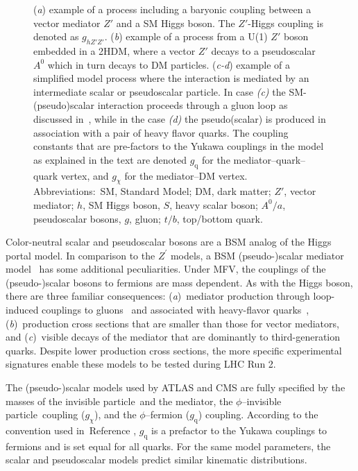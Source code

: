 \documentclass{ar-1col}
\newcommand{\chiDM}{\ensuremath{\chi}\xspace}
\newcommand{\IP}{invisible particle}
\newcommand{\gDM}{\ensuremath{g_{\chiDM}}\xspace}
\newcommand{\gdm}{\gDM}
\newcommand{\gq}{$g_{\mathrm{q}}$\xspace}
\newcommand{\ghZprimeZprime}{\ensuremath{g_{hZ'Z'}}\xspace}
\newcommand{\Zprime}{\ensuremath{{Z}^\prime}\xspace}
\begin{document}
\begin{figure}[!htpb]
\caption{
(\textit{a}) example of a process including a baryonic coupling between a vector mediator $Z'$ and a SM Higgs boson. The $Z'$-Higgs coupling is denoted as \ghZprimeZprime. 
(\textit{b}) example of a process from a U(1) $Z'$ boson embedded in a 2HDM, where a vector $Z'$ decays to a pseudoscalar $A^0$ which in turn decays to DM particles. 
(\textit{c-d}) example of a simplified model process where the interaction is mediated by an intermediate scalar or pseudoscalar particle. In case \textit{(c)} the SM-(pseudo)scalar interaction proceeds through a gluon loop as discussed in~\cite{Haisch:2013ata}, while in the case \textit{(d)} the pseudo(scalar) is produced in association with a pair of heavy flavor quarks. The coupling constants that are pre-factors to the Yukawa couplings in the model as explained in the text are denoted \gq for the mediator--quark--quark vertex, and \gdm for the mediator--DM vertex. 
Abbreviations:\ SM, Standard Model; DM, dark matter; $Z'$, vector mediator; $h$, SM Higgs boson, $S$, heavy scalar boson; $A^0/a$, pseudoscalar bosons, $g$, gluon; $t/b$, top/bottom quark. }
\label{fig:feynman_1}
\end{figure}

{Color-neutral scalar and pseudoscalar bosons} are a BSM
analog of the Higgs portal model. In comparison to the \Zprime
models, a BSM (pseudo-)scalar mediator
model~\cite{Buckley:2014fba} has some additional peculiarities.
Under MFV, the couplings of the (pseudo-)scalar bosons to fermions
are mass dependent. As with the Higgs boson, there are three
familiar consequences: (\textit{a})\ mediator production through loop-induced
couplings to gluons~\cite{Haisch:2015ioa} and associated with
heavy-flavor quarks~\cite{Buckley:2014fba}, (\textit{b})\ production
cross sections that are smaller than those for vector mediators, and (\textit{c})\ visible
decays of the mediator that are dominantly to third-generation quarks.
Despite lower production cross sections, the more specific
experimental signatures enable these models to be tested during
LHC Run 2.

The (pseudo-)scalar models used by ATLAS and CMS are fully
specified by the masses of the \IP\  and the mediator, the
$\phi$--\IP\  coupling (\gdm), and the $\phi$--fermion (\gq) coupling.
According to the convention used in~Reference , \gq is a
prefactor to the Yukawa couplings to fermions and is set equal for
all quarks. For the same model parameters, the scalar and
pseudoscalar models predict similar kinematic distributions.
\end{document}
